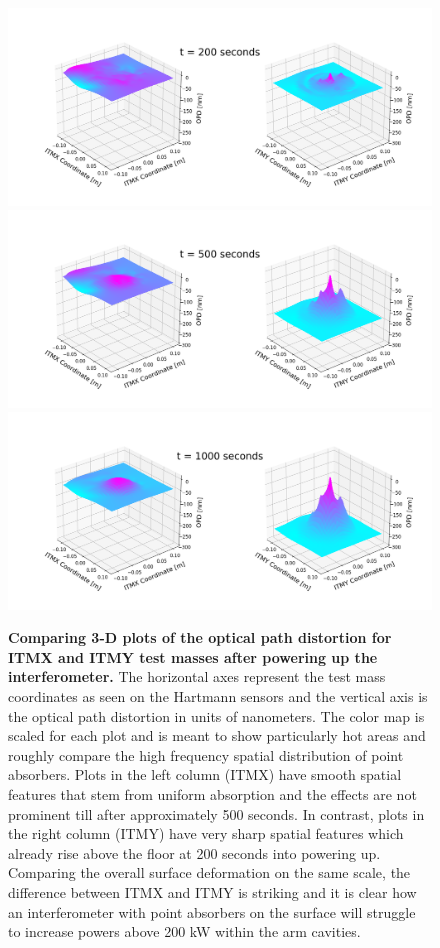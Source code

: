 \begin{figure}[ht]
	\centering
	\includegraphics[width=0.4\textheight]{../Figures/1231726400_3d_200dur_30W_ITM.png}\quad
	\includegraphics[width=0.4\textheight]{../Figures/1231726400_3d_500dur_30W_ITM.png}\quad
	\includegraphics[width=0.4\textheight]{../Figures/1231726400_3d_1000dur_30W_ITM.png}\quad
	\caption[Comparing 3-D plots of the optical path distortion for ITMX and ITMY test masses after powering up the interferometer.]  
	{\textbf{Comparing 3-D plots of the optical path distortion for ITMX and ITMY test masses after powering up the interferometer.}
		The horizontal axes represent the test mass coordinates as seen on the Hartmann sensors and the vertical axis is the optical path distortion in units of nanometers. The color map is scaled for each plot and is meant to show particularly hot areas and roughly compare the high frequency spatial distribution of point absorbers. Plots in the left column (ITMX) have smooth spatial features that stem from uniform absorption and the effects are not prominent till after approximately 500 seconds.  In contrast, plots in the right column (ITMY) have very sharp spatial features which already rise above the floor at 200 seconds into powering up.  Comparing the overall surface deformation on the same scale, the difference between ITMX and ITMY is striking and it is clear how an interferometer with point absorbers on the surface will struggle to increase powers above 200 kW within the arm cavities.
}
\end{figure}
